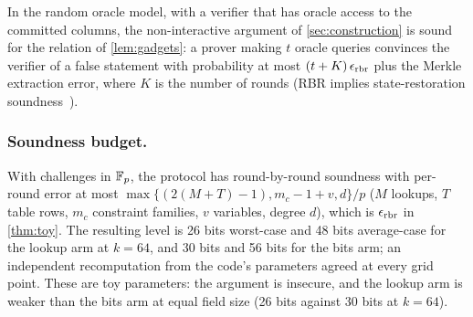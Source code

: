 \begin{theorem}\label{thm:toy}
In the random oracle model, with a verifier that has oracle access to the committed columns, the non-interactive
argument of \cref{sec:construction} is sound for the relation of \cref{lem:gadgets}: a prover making $t$ oracle
queries convinces the verifier of a false statement with probability at most $(t + K)\,\epsilon_{\mathrm{rbr}}$ plus the
Merkle extraction error, where $K$ is the number of rounds (RBR implies state-restoration soundness~\cite{CY24}).
\end{theorem}

\subsubsection{Soundness budget.} With challenges in $\mathbb{F}_p$, the protocol has round-by-round soundness with per-round
error at most $\max\{(2(M+T)-1), m_c - 1 + v, d\}/p$ ($M$ lookups, $T$ table rows, $m_c$ constraint families, $v$
variables, degree $d$), which is $\epsilon_{\mathrm{rbr}}$ in \cref{thm:toy}. The resulting
level is 26 bits worst-case and 48 bits average-case for the lookup arm at $k = 64$, and
30 bits and 56 bits for the bits arm; an independent recomputation from the code's parameters
agreed at every grid point. These are toy parameters: the argument is insecure, and the lookup arm is
weaker than the bits arm at equal field size (26 bits against 30 bits at $k = 64$).
